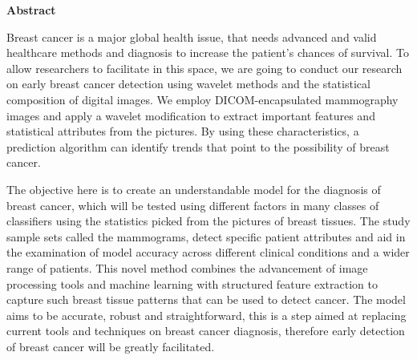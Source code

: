 \begin{center}
	\textbf{\large Abstract}
\end{center}
\noindent
Breast cancer is a major global health issue, that needs advanced and valid healthcare methods and diagnosis to increase the patient’s chances of survival. To allow researchers to facilitate in this space, we are going to conduct our research on early breast cancer detection using wavelet methods and the statistical composition of digital images. We employ DICOM-encapsulated mammography images and apply a wavelet modification to extract important features and statistical attributes from the pictures. By using these characteristics, a prediction algorithm can identify trends that point to the possibility of breast cancer.

The objective here is to create an understandable model for the diagnosis of breast cancer, which will be tested using different factors in many classes of classifiers using the statistics picked from the pictures of breast tissues. The study sample sets called the mammograms, detect specific patient attributes and aid in the examination of model accuracy across different clinical conditions and a wider range of patients. This novel method combines the advancement of image processing tools and machine learning with structured feature extraction to capture such breast tissue patterns that can be used to detect cancer. The model aims to be accurate, robust and straightforward, this is a step aimed at replacing current tools and techniques on breast cancer diagnosis, therefore early detection of breast cancer will be greatly facilitated.